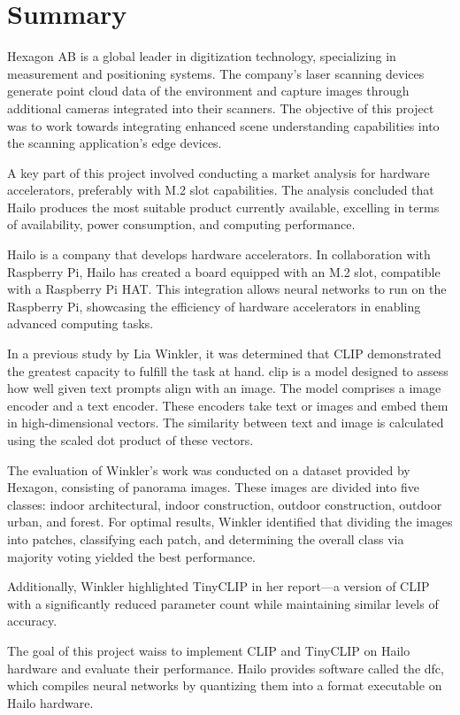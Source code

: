 \chapter*{Summary}  
Hexagon AB is a global leader in digitization technology, specializing in measurement and positioning systems.  
The company's laser scanning devices generate point cloud data of the environment and capture images through additional cameras integrated into their scanners.  
The objective of this project was to work towards integrating enhanced scene understanding capabilities into the scanning application's edge devices.  

A key part of this project involved conducting a market analysis for hardware accelerators, preferably with M.2 slot capabilities.  
The analysis concluded that Hailo produces the most suitable product currently available, excelling in terms of availability, power consumption, and computing performance.  

Hailo is a company that develops hardware accelerators.  
In collaboration with Raspberry Pi, Hailo has created a board equipped with an M.2 slot, compatible with a Raspberry Pi HAT.  
This integration allows neural networks to run on the Raspberry Pi, showcasing the efficiency of hardware accelerators in enabling advanced computing tasks.  

In a previous study by Lia Winkler, it was determined that CLIP demonstrated the greatest capacity to fulfill the task at hand.  
\acrfull{clip} is a model designed to assess how well given text prompts align with an image.  
The model comprises a image encoder and a text encoder.
These encoders take text or images and embed them in high-dimensional vectors. 
The similarity between text and image is calculated using the scaled dot product of these vectors.  

The evaluation of Winkler's work was conducted on a dataset provided by Hexagon, consisting of panorama images.  
These images are divided into five classes: indoor architectural, indoor construction, outdoor construction, outdoor urban, and forest.  
For optimal results, Winkler identified that dividing the images into patches, classifying each patch, and determining the overall class via majority voting yielded the best performance.  

Additionally, Winkler highlighted TinyCLIP in her report—a version of CLIP with a significantly reduced parameter count while maintaining similar levels of accuracy.  

The goal of this project waiss to implement CLIP and TinyCLIP on Hailo hardware and evaluate their performance.  
Hailo provides software called the \acrfull{dfc}, which compiles neural networks by quantizing them into a format executable on Hailo hardware.  

